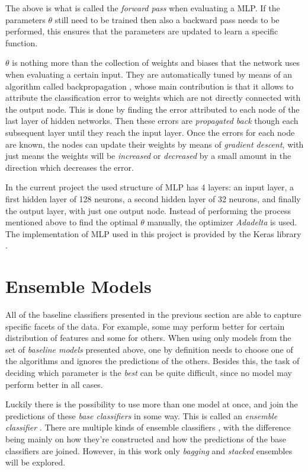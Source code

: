 \documentclass[epsfig,a4paper,11pt,titlepage,twoside,openany]{book}
\begin{document}
The above is what is called the \textit{forward pass} when evaluating a MLP. If the parameters $\theta$ still need to be trained then also a backward pass needs to be performed, this ensures that the parameters are updated to learn a specific function.

$\theta$ is nothing more than the collection of weights and biases that the network uses when evaluating a certain input. They are automatically tuned by means of an algorithm called backpropagation \cite{Rumelhart1986}, whose main contribution is that it allows to attribute the classification error to weights which are not directly connected with the output node. This is done by finding the error attributed to each node of the last layer of hidden networks. Then these errors are \textit{propagated back} though each subsequent layer until they reach the input layer. Once the errors for each node are known, the nodes can update their weights by means of \textit{gradient descent}, with just means the weights will be \textit{increased} or \textit{decreased} by a small amount in the direction which decreases the error.

In the current project the used structure of MLP has 4 layers: an input layer, a first hidden layer of 128 neurons, a second hidden layer of 32 neurons, and finally the output layer, with just one output node. Instead of performing the process mentioned above to find the optimal $\theta$ manually, the optimizer \textit{Adadelta} \cite{zeiler2012adadelta} is used. The implementation of MLP used in this project is provided by the Keras library \cite{chollet2015keras}.


\section{Ensemble Models}
\label{sec:ensemble-models}

All of the baseline classifiers presented in the previous section are able to capture specific facets of the data. For example, some may perform better for certain distribution of features and some for others. When using only models from the set of \textit{baseline models} presented above, one by definition needs to choose one of the algorithms and ignores the predictions of the others. Besides this, the task of deciding which parameter is the \textit{best} can be quite difficult, since no model may perform better in all cases. 

Luckily there is the possibility to use more than one model at once, and join the predictions of these \textit{base classifiers} in some way. This is called an \textit{ensemble classifier} \cite{zhou2012ensemble}. There are multiple kinds of ensemble classifiers \cite{opitz1999popular,dietterich2000ensemble}, with the difference being mainly on how they're constructed and how the predictions of the base classifiers are joined. However, in this work only \textit{bagging} and \textit{stacked} ensembles will be explored.
\end{document}
